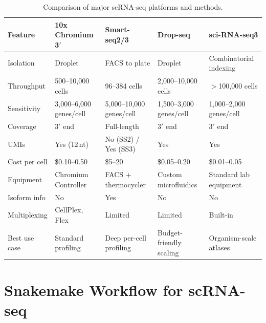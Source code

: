 \begin{table}[htbp]
\centering
\caption{Comparison of major scRNA-seq platforms and methods.}
\label{tab:scrnaseq:platforms}
\small
\begin{tabularx}{\textwidth}{lXXXX}
\toprule
\textbf{Feature} & \textbf{10x Chromium 3$'$} & \textbf{Smart-seq2/3} & \textbf{Drop-seq} & \textbf{sci-RNA-seq3} \\
\midrule
Isolation & Droplet & FACS to plate & Droplet & Combinatorial indexing \\
Throughput & 500--10,000 cells & 96--384 cells & 2,000--10,000 cells & $>$100,000 cells \\
Sensitivity & 3,000--6,000 genes/cell & 5,000--10,000 genes/cell & 1,500--3,000 genes/cell & 1,000--2,000 genes/cell \\
Coverage & 3$'$ end & Full-length & 3$'$ end & 3$'$ end \\
UMIs & Yes (12\,nt) & No (SS2) / Yes (SS3) & Yes & Yes \\
Cost per cell & \$0.10--0.50 & \$5--20 & \$0.05--0.20 & \$0.01--0.05 \\
Equipment & Chromium Controller & FACS + thermocycler & Custom microfluidics & Standard lab equipment \\
Isoform info & No & Yes & No & No \\
Multiplexing & CellPlex, Flex & Limited & Limited & Built-in \\
Best use case & Standard profiling & Deep per-cell profiling & Budget-friendly scaling & Organism-scale atlases \\
\bottomrule
\end{tabularx}
\end{table}


\section{Snakemake Workflow for scRNA-seq}
\label{sec:scrnaseq:snakemake}

